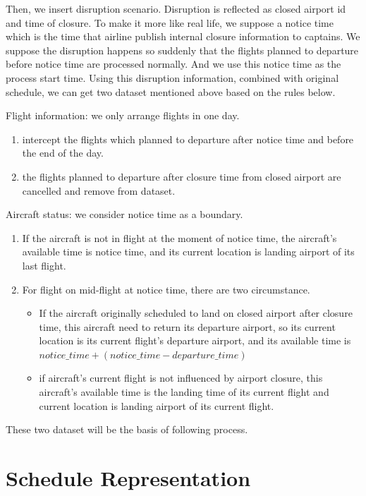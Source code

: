 \documentclass[senior]{IPSstyle}
\begin{document}
Then, we insert disruption scenario. Disruption is reflected as closed airport id and time of closure. To make it more like real life, we suppose a notice time which is the time that airline publish internal closure information to captains. We suppose the disruption happens so suddenly that the flights planned to departure before notice time are processed normally. And we use this notice time as the process start time. Using this disruption information, combined with original schedule,  we can get two dataset mentioned above based on the rules below.

Flight information: we only arrange flights in one day.
\begin{enumerate}
    \item intercept the flights which planned to departure after notice time and before the end of the day.
    \item the flights planned to departure after closure time from closed airport are cancelled and remove from dataset.
\end{enumerate}

Aircraft status: we consider notice time as a boundary. 
\begin{enumerate}
    \item If the aircraft is not in flight at the moment of notice time, the aircraft’s available time is notice time, and its current location is landing airport of its last flight. 
    \item For flight on mid-flight at notice time, there are two circumstance.
    \begin{itemize}
        \item If the aircraft originally scheduled to land on closed airport after closure time, this aircraft need to return its departure airport, so its current location is its current flight’s departure airport, and its available time is $notice\_time+ (notice\_time - departure\_time)$
        \item if aircraft’s current flight is not influenced by airport closure, this aircraft’s available time is the landing time of its current flight and current location is landing airport of its current flight.
    \end{itemize}
\end{enumerate}
These two dataset will be the basis of following process.

\section{Schedule Representation}\label{Section:relationship}
\end{document}
